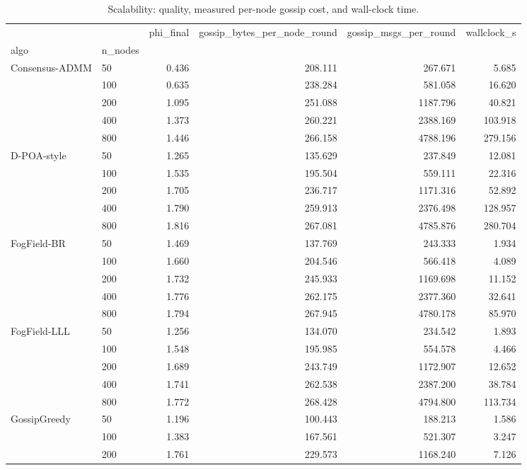 \begin{table}
\caption{Scalability: quality, measured per-node gossip cost, and wall-clock time.}
\label{tab:table3_scalability}
\begin{tabular}{llrrrr}
\toprule
 &  & phi\_final & gossip\_bytes\_per\_node\_round & gossip\_msgs\_per\_round & wallclock\_s \\
algo & n_nodes &  &  &  &  \\
\midrule
\multirow[t]{5}{*}{Consensus-ADMM} & 50 & 0.436 & 208.111 & 267.671 & 5.685 \\
 & 100 & 0.635 & 238.284 & 581.058 & 16.620 \\
 & 200 & 1.095 & 251.088 & 1187.796 & 40.821 \\
 & 400 & 1.373 & 260.221 & 2388.169 & 103.918 \\
 & 800 & 1.446 & 266.158 & 4788.196 & 279.156 \\
\cline{1-6}
\multirow[t]{5}{*}{D-POA-style} & 50 & 1.265 & 135.629 & 237.849 & 12.081 \\
 & 100 & 1.535 & 195.504 & 559.111 & 22.316 \\
 & 200 & 1.705 & 236.717 & 1171.316 & 52.892 \\
 & 400 & 1.790 & 259.913 & 2376.498 & 128.957 \\
 & 800 & 1.816 & 267.081 & 4785.876 & 280.704 \\
\cline{1-6}
\multirow[t]{5}{*}{FogField-BR} & 50 & 1.469 & 137.769 & 243.333 & 1.934 \\
 & 100 & 1.660 & 204.546 & 566.418 & 4.089 \\
 & 200 & 1.732 & 245.933 & 1169.698 & 11.152 \\
 & 400 & 1.776 & 262.175 & 2377.360 & 32.641 \\
 & 800 & 1.794 & 267.945 & 4780.178 & 85.970 \\
\cline{1-6}
\multirow[t]{5}{*}{FogField-LLL} & 50 & 1.256 & 134.070 & 234.542 & 1.893 \\
 & 100 & 1.548 & 195.985 & 554.578 & 4.466 \\
 & 200 & 1.689 & 243.749 & 1172.907 & 12.652 \\
 & 400 & 1.741 & 262.538 & 2387.200 & 38.784 \\
 & 800 & 1.772 & 268.428 & 4794.800 & 113.734 \\
\cline{1-6}
\multirow[t]{5}{*}{GossipGreedy} & 50 & 1.196 & 100.443 & 188.213 & 1.586 \\
 & 100 & 1.383 & 167.561 & 521.307 & 3.247 \\
 & 200 & 1.761 & 229.573 & 1168.240 & 7.126 \\

\end{tabular}
\end{table}
